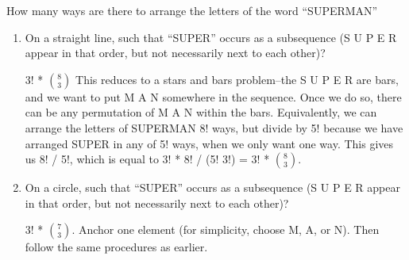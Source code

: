 \question How many ways are there to arrange the letters of the word 
“SUPERMAN”
\begin{enumerate}[label=(\alph*)]

\item On a straight line, such that “SUPER” occurs as a subsequence 
(S U P E R appear in that order, but not necessarily next to each other)? 
\begin{solution} [.5 cm] 3! * ${8 \choose 3}$
This reduces to a stars and bars problem--the S U P E R are bars, and 
we want to put M A N somewhere in the sequence. Once we do so, there 
can be any permutation of M A N within the bars.
Equivalently, we can arrange the letters of SUPERMAN 8! ways, but 
divide by 5! because we have arranged SUPER in any of 5! ways, when 
we only want one way. This gives us 8! / 5!, which is equal to 
3! * 8! / (5! 3!) = 3! * ${8 \choose 3}$.
 \end{solution}

\item On a circle, such that “SUPER” occurs as a subsequence (S U P E R 
appear in that order, but not necessarily next to each other)? 
\begin{solution} [.5 cm] 3! * ${7 \choose 3}$.
Anchor one element (for simplicity, choose M, A, or N). Then follow the same procedures as earlier.
\end{solution}

\end{enumerate}